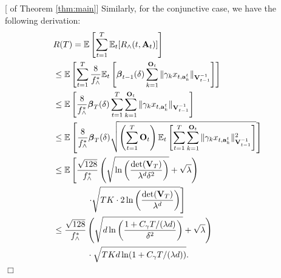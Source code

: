 \documentclass{article}
\newcommand{\bbeta}{\boldsymbol{\beta}}
\newcommand{\EE}{\mathbb{E}}
\newcommand{\bA}{\mathbf{A}}
\newcommand{\ba}{\mathbf{a}}
\newcommand{\bO}{\mathbf{O}}
\newcommand{\bV}{\mathbf{V}}
\newcommand{\norm}[1]{\| #1 \|}
\newenvironment{proof}{\noindent {\textbf{Proof. }}}{$\Box$ \medskip}
\begin{document}
\begin{proof}[ of Theorem \ref{thm:main}]
Similarly, for the conjunctive case, we have the following derivation:
\begin{align}
&R(T) = \EE \left[ \sum_{t=1}^{T} \EE_{t}[R_{\wedge}(t, \bA_t)] \right] \notag\\
&\leq \EE \left[\sum_{t=1}^{T} \frac{8}{f_{\wedge}^{\ast}} \EE_t\left[\bbeta_{t-1}(\delta)\sum_{k=1}^{\bO_t}\norm{\gamma_k x_{t,\ba_k^t}}_{\bV_{t-1}^{-1}} \right] \right] \label{eq:pfMCdeltaEst}\\
&\leq \EE\left[\frac{8}{f_{\wedge}^{\ast}} \bbeta_{T}(\delta) \sum_{t=1}^{T} \sum_{k=1}^{\bO_t}\norm{\gamma_k x_{t,\ba_k^t}}_{\bV_{t-1}^{-1}} \right] \label{eq:pfMCbeta}\\
&\leq \EE\left[\frac{8}{f_{\wedge}^{\ast}} \bbeta_{T}(\delta) \sqrt{ \left(\sum_{t=1}^{T} \bO_t \right) \EE_t \left[\sum_{t=1}^{T} \sum_{k=1}^{\bO_t}\norm{\gamma_k x_{t,\ba_k^t}}_{\bV_{t-1}^{-1}}^2 \right]} \right] \label{eq:pfMCmeaneq}\\
&\leq \EE \left[\frac{\sqrt{128}}{f_{\wedge}^{\ast}} \left(\sqrt{\ln\left(\frac{\det(\bV_T)}{\lambda^d \delta^2}\right) } + \sqrt{\lambda} \right) \right. \notag\\
&\qquad \qquad \left. \cdot \sqrt{TK \cdot 2\ln \left(\frac{\det(\bV_T)}{\lambda^d} \right)} \right] \label{eq:pfMCsumXi}\\
&\leq \frac{\sqrt{128}}{f_{\wedge}^{\ast}} \left(\sqrt{d \ln \left( \frac{1 + C_\gamma T/(\lambda d)}{\delta^2}\right) } + \sqrt{\lambda} \right) \notag\\
&\qquad \qquad \cdot \sqrt{TKd\ln(1 + C_\gamma T/(\lambda d))}. \label{eq:pfMCdetEst}
\end{align}
\end{proof}

	
	


	
\end{document}
